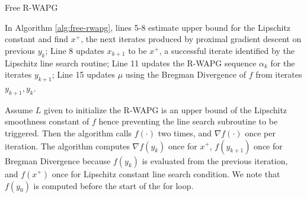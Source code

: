 \documentclass[12pt]{article}
\begin{document}
    \begin{algorithm}
        \begin{algorithmic}[1]
        {\footnotesize
            \ENDWHILE
        \ENDFOR
        }
        \end{algorithmic}
        \caption{Free R-WAPG}
        \label{alg:free-rwapg}
    \end{algorithm}
    \par
    In Algorithm \ref{alg:free-rwapg}, lines 5-8 estimate
    upper bound for the Lipschitz constant and find $x^+$, the next iterates produced by proximal gradient descent on previous $y_k$;
    Line 8 updates $x_{k + 1}$ to be $x^+$, a successful iterate identified by the Lipschitz line search routine;
    Line 11 updates the R-WAPG sequence $\alpha_k$ for the iterates $y_{k + 1}$;
    Line 15 updates $\mu$ using the Bregman Divergence of $f$ from iterates $y_{k + 1}, y_k$.
    \par
    Assume $L$ given to initialize the R-WAPG is an upper bound of the Lipschitz smoothness constant of $f$ hence preventing the line search subroutine to be triggered.
    Then the algorithm calls $f(\cdot)$ two times, and $\nabla f(\cdot)$ once per iteration.
    The algorithm computes $\nabla f(y_k)$ once for $x^+$, $f(y_{k + 1})$ once for Bregman Divergence because $f(y_{k})$ is evaluated from the previous iteration, and $f(x^+)$ once for Lipschitz constant line search condition.
    We note that $f(y_0)$ is computed before the start of the for loop.
\end{document}
